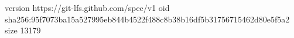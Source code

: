 version https://git-lfs.github.com/spec/v1
oid sha256:95f7073ba15a527995eb844b4522f488c8b38b16df5b31756715462d80e5f5a2
size 13179
